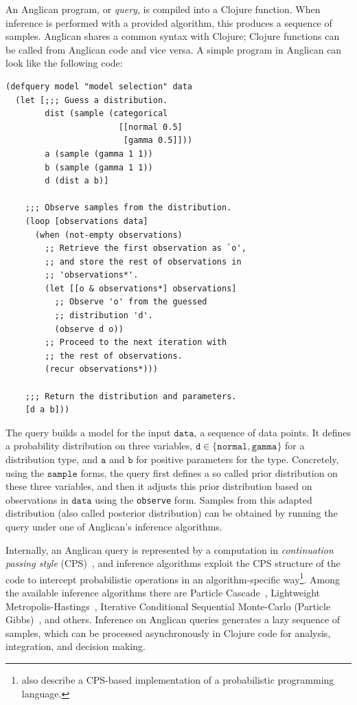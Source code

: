 \documentclass[preprint]{sigplanconf}
\begin{document}
An Anglican program, or \textit{query}, is compiled into a
Clojure function. When inference is performed with a provided
algorithm, this produces a sequence of samples. Anglican shares
a common syntax with Clojure; Clojure functions can be called
from Anglican code and vice versa. A simple program in Anglican
can look like the following code:
\begin{lstlisting}[style=default]
(defquery model "model selection" data
  (let [;;; Guess a distribution.
        dist (sample (categorical
                       [[normal 0.5]
                        [gamma 0.5]]))
        a (sample (gamma 1 1))
        b (sample (gamma 1 1))
        d (dist a b)]

    ;;; Observe samples from the distribution.
    (loop [observations data]
      (when (not-empty observations)
        ;; Retrieve the first observation as `o',
        ;; and store the rest of observations in 
        ;; 'observations*'.
        (let [[o & observations*] observations]
          ;; Observe 'o' from the guessed 
          ;; distribution 'd'.
          (observe d o))
        ;; Proceed to the next iteration with
        ;; the rest of observations.
        (recur observations*)))

    ;;; Return the distribution and parameters.
    [d a b]))
\end{lstlisting}
The query builds a model for the input $\texttt{data}$, 
a sequence of data points.
It defines a probability distribution on three variables, 
$\texttt{d} \in \{\texttt{normal},\texttt{gamma}\}$
for a distribution type, and $\texttt{a}$ and $\texttt{b}$ for
positive parameters for the type. Concretely,
using the $\texttt{sample}$ forms, the query
first defines a so called prior distribution on these three variables,
and then it adjusts this prior distribution based on observations in
$\texttt{data}$ using the \texttt{observe} form.
Samples from this adapted distribution (also called posterior distribution)
can be obtained by running the query under one of Anglican's
inference algorithms.

Internally, an Anglican query is represented by a computation in
\textit{continuation passing style} (CPS)~\cite{AJ89}, and inference algorithms
exploit the CPS structure of the code to intercept probabilistic
operations in an algorithm-specific way\footnote{\cite{GS15}
also describe a CPS-based implementation of a probabilistic
programming language.}. Among the available
inference algorithms there are Particle Cascade~\cite{PWD+14},
Lightweight Metropolis-Hastings~\cite{WSG11}, Iterative Conditional
Sequential Monte-Carlo (Particle Gibbs)~\cite{WVM14}, and others.
Inference on Anglican queries generates a lazy sequence of
samples, which can be processed asynchronously in Clojure
code for analysis, integration, and decision making.
\end{document}
